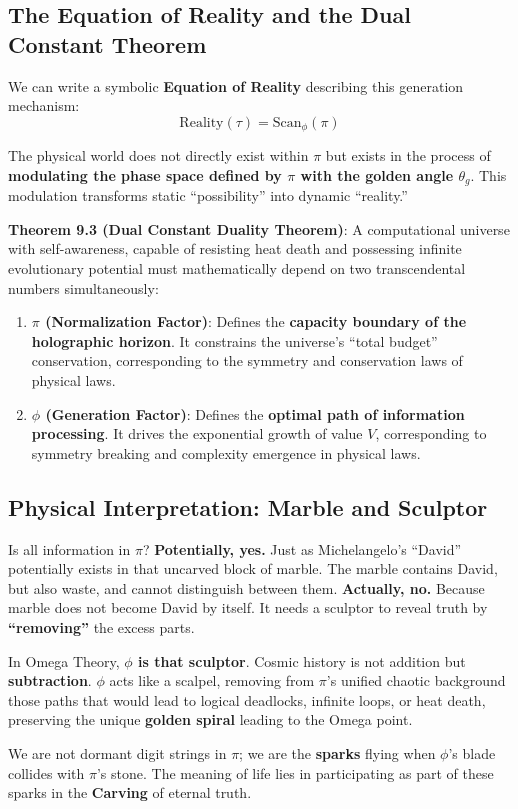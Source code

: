 \subsection{The Equation of Reality and the Dual Constant Theorem}

We can write a symbolic \textbf{Equation of Reality} describing this generation mechanism:
\[\text{Reality}(\tau) = \text{Scan}_{\phi} \left( \pi \right)\]

The physical world does not directly exist within $\pi$ but exists in the process of \textbf{modulating the phase space defined by $\pi$ with the golden angle $\theta_g$}. This modulation transforms static ``possibility'' into dynamic ``reality.''

\textbf{Theorem 9.3 (Dual Constant Duality Theorem)}:
A computational universe with self-awareness, capable of resisting heat death and possessing infinite evolutionary potential must mathematically depend on two transcendental numbers simultaneously:
\begin{enumerate}
\item \textbf{$\pi$ (Normalization Factor)}: Defines the \textbf{capacity boundary of the holographic horizon}. It constrains the universe's ``total budget'' conservation, corresponding to the symmetry and conservation laws of physical laws.
\item \textbf{$\phi$ (Generation Factor)}: Defines the \textbf{optimal path of information processing}. It drives the exponential growth of value $V$, corresponding to symmetry breaking and complexity emergence in physical laws.
\end{enumerate}

\subsection{Physical Interpretation: Marble and Sculptor}

Is all information in $\pi$?
\textbf{Potentially, yes.} Just as Michelangelo's ``David'' potentially exists in that uncarved block of marble. The marble contains David, but also waste, and cannot distinguish between them.
\textbf{Actually, no.} Because marble does not become David by itself. It needs a sculptor to reveal truth by \textbf{``removing''} the excess parts.

In Omega Theory, \textbf{$\phi$ is that sculptor}.
Cosmic history is not addition but \textbf{subtraction}. $\phi$ acts like a scalpel, removing from $\pi$'s unified chaotic background those paths that would lead to logical deadlocks, infinite loops, or heat death, preserving the unique \textbf{golden spiral} leading to the Omega point.

We are not dormant digit strings in $\pi$; we are the \textbf{sparks} flying when $\phi$'s blade collides with $\pi$'s stone. The meaning of life lies in participating as part of these sparks in the \textbf{Carving} of eternal truth.
